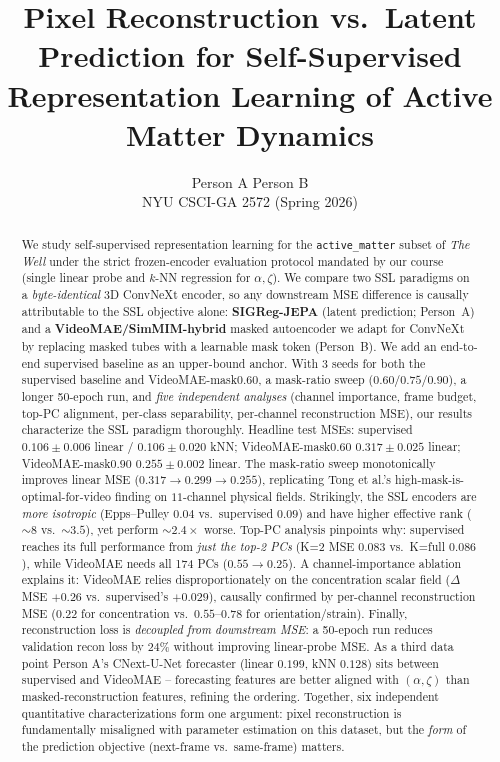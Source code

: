 \documentclass{article}
\title{Pixel Reconstruction vs.\ Latent Prediction for Self-Supervised
Representation Learning of Active Matter Dynamics}
\author{Person A \quad Person B \\ NYU CSCI-GA 2572 (Spring 2026)}
\date{}
\begin{document}
\maketitle

\begin{abstract}
We study self-supervised representation learning for the
\texttt{active\_matter} subset of \emph{The Well} \citep{ohana2025well} under
the strict frozen-encoder evaluation protocol mandated by our course (single
linear probe and $k$-NN regression for $\alpha,\zeta$). We compare two SSL
paradigms on a \emph{byte-identical} 3D ConvNeXt encoder, so any downstream
MSE difference is causally attributable to the SSL objective alone:
\textbf{SIGReg-JEPA} \citep{balestriero2026lejepa} (latent prediction;
Person~A) and a \textbf{VideoMAE/SimMIM-hybrid} \citep{tong2022videomae,
xie2022simmim} masked autoencoder we adapt for ConvNeXt by replacing masked
tubes with a learnable mask token (Person~B). We add an end-to-end
supervised baseline as an upper-bound anchor. With 3 seeds for both the
supervised baseline and VideoMAE-mask$0.60$, a mask-ratio sweep
($0.60/0.75/0.90$), a longer 50-epoch run, and \emph{five independent
analyses} (channel importance, frame budget, top-PC alignment,
per-class separability, per-channel reconstruction MSE), our results
characterize the SSL paradigm thoroughly. Headline test MSEs: supervised
$0.106\!\pm\!0.006$ linear / $0.106\!\pm\!0.020$ kNN; VideoMAE-mask$0.60$
$0.317\!\pm\!0.025$ linear; VideoMAE-mask$0.90$ $0.255\!\pm\!0.002$ linear.
The mask-ratio sweep monotonically improves linear MSE
($0.317\!\to\!0.299\!\to\!0.255$), replicating Tong et al.'s
high-mask-is-optimal-for-video finding on $11$-channel physical fields.
Strikingly, the SSL encoders are \emph{more isotropic} (Epps--Pulley $0.04$
vs.\ supervised $0.09$) and have higher effective rank ($\sim$$8$ vs.\
$\sim$$3.5$), yet perform $\sim$$2.4{\times}$ worse. Top-PC analysis
pinpoints why: supervised reaches its full performance from \emph{just the
top-2 PCs} (K=2 MSE $0.083$ vs.\ K=full $0.086$), while VideoMAE needs all
174 PCs ($0.55\!\to\!0.25$). A channel-importance ablation explains it:
VideoMAE relies disproportionately on the concentration scalar field
($\Delta$MSE $+0.26$ vs.\ supervised's $+0.029$), causally confirmed by
per-channel reconstruction MSE ($0.22$ for concentration vs.\ $0.55$--$0.78$
for orientation/strain). Finally, reconstruction loss is \emph{decoupled
from downstream MSE}: a 50-epoch run reduces validation recon loss by $24\%$
without improving linear-probe MSE. As a third data point Person A's
CNext-U-Net forecaster (linear $0.199$, kNN $0.128$) sits between supervised
and VideoMAE -- forecasting features are better aligned with $(\alpha,\zeta)$
than masked-reconstruction features, refining the
\citet{qu2026spatiotemporal} ordering. Together, six independent quantitative
characterizations form one argument: pixel reconstruction is fundamentally
misaligned with parameter estimation on this dataset, but the
\emph{form} of the prediction objective (next-frame vs.\ same-frame) matters.
\end{abstract}
\end{document}
